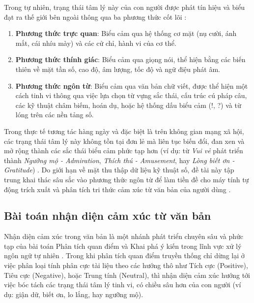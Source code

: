 Trong tự nhiên, trạng thái tâm lý này của con người được phát tín hiệu và biểu đạt ra thế giới bên ngoài thông qua ba phương thức cốt lõi \cite{jurafsky2020speech}:
\begin{enumerate}
	\item \textbf{Phương thức trực quan}: Biểu cảm qua hệ thống cơ mặt (nụ cười, ánh mắt, cái nhíu mày) và các cử chỉ, hành vi của cơ thể.
	
	\item \textbf{Phương thức thính giác}: Biểu cảm qua giọng nói, thể hiện bằng các biến thiên về mặt tần số, cao độ, âm lượng, tốc độ và ngữ điệu phát âm.
	
	\item \textbf{Phương thức ngôn từ}: Biểu cảm qua văn bản chữ viết, được thể hiện một cách tinh vi thông qua việc lựa chọn từ vựng sắc thái, cấu trúc cú pháp câu, các kỹ thuật châm biếm, hoán dụ, hoặc hệ thống dấu biểu cảm (!, ?) và từ lóng trên các nền tảng số.
\end{enumerate}

Trong thực tế tương tác hàng ngày và đặc biệt là trên không gian mạng xã hội, các trạng thái tâm lý này không tồn tại đơn lẻ mà liên tục biến đổi, đan xen và mở rộng thành các sắc thái biểu cảm phức tạp hơn (ví dụ: từ \textit{Vui vẻ} phát triển thành \textit{Ngưỡng mộ - Admiration}, \textit{Thích thú - Amusement}, hay \textit{Lòng biết ơn - Gratitude}) \cite{jurafsky2020speech}. Do giới hạn về mặt thu thập dữ liệu kỹ thuật số, đề tài này tập trung khai thác sâu sắc vào phương thức ngôn từ để làm tiền đề cho máy tính tự động trích xuất và phân tích tri thức cảm xúc từ văn bản của người dùng \cite{jurafsky2020speech}. 

\subsection{Bài toán nhận diện cảm xúc từ văn bản}

Nhận diện cảm xúc trong văn bản là một nhánh phát triển chuyên sâu và phức tạp của bài toán Phân tích quan điểm và Khai phá ý kiến trong lĩnh vực xử lý ngôn ngữ tự nhiên \cite{singh2018natural}. Trong khi phân tích quan điểm truyền thống chỉ dừng lại ở việc phân loại tính phân cực tài liệu theo các hướng thô như Tích cực (Positive), Tiêu cực (Negative), hoặc Trung tính (Neutral), thì nhận diện cảm xúc hướng tới việc bóc tách các trạng thái tâm lý tinh vi, có chiều sâu hơn của con người (ví dụ: giận dữ, biết ơn, lo lắng, hay ngưỡng mộ).

